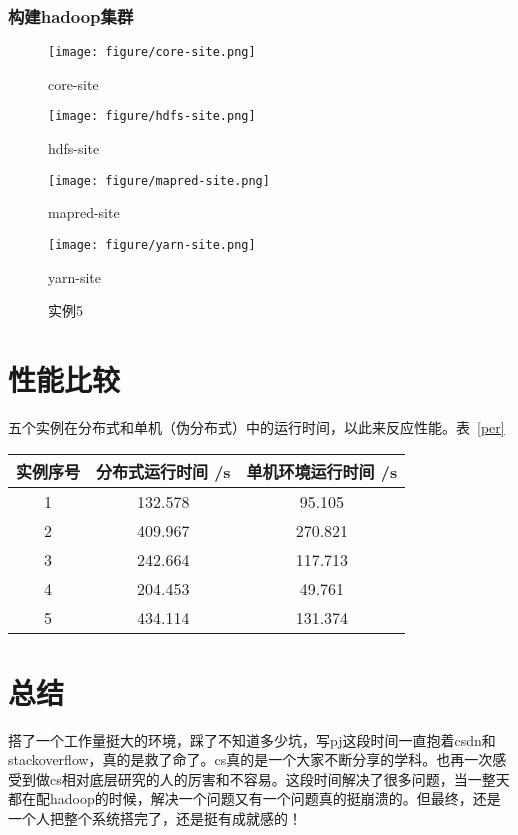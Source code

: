 \documentclass[UTF8]{article}
\begin{document}
\subsubsection{构建hadoop集群}

\begin{figure}[htb]\centering
	\texttt{[image: figure/core-site.png]}
	\caption{core-site}\label{core-site}
\end{figure}
\begin{figure}[htb]\centering
	\texttt{[image: figure/hdfs-site.png]}
	\caption{hdfs-site}\label{hdfs-site}
\end{figure}
\begin{figure}[htb]\centering
	\texttt{[image: figure/mapred-site.png]}
	\caption{mapred-site}\label{mapred-site}
\end{figure}
\begin{figure}[htb]\centering
	\texttt{[image: figure/yarn-site.png]}
	\caption{yarn-site}\label{yarn-site}
\end{figure}



\begin{figure}[htb] \centering
	\caption{实例5}\label{ins6}
\end{figure}


\section{性能比较}
五个实例在分布式和单机（伪分布式）中的运行时间，以此来反应性能。表~\ref{per}
\begin{table*}[!t]\centering
	\begin{tabular}{c | c c }
		\hline
		实例序号 & 分布式运行时间 /s & 单机环境运行时间 /s\\
		\hline
		1& 132.578 & 95.105\\
		2& 409.967 & 270.821\\
		3& 242.664 & 117.713\\
		4& 204.453 & 49.761\\
		5& 434.114 & 131.374\\
		\hline
	\end{tabular}
	\caption{Performance}\label{per}
\end{table*}



\section{总结}
搭了一个工作量挺大的环境，踩了不知道多少坑，写pj这段时间一直抱着csdn和stackoverflow，真的是救了命了。cs真的是一个大家不断分享的学科。也再一次感受到做cs相对底层研究的人的厉害和不容易。这段时间解决了很多问题，当一整天都在配hadoop的时候，解决一个问题又有一个问题真的挺崩溃的。但最终，还是一个人把整个系统搭完了，还是挺有成就感的！
\end{document}

